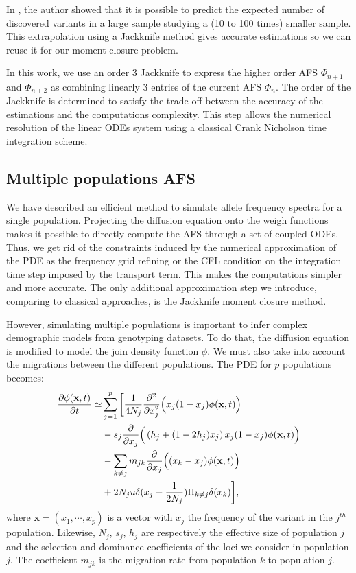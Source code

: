 In \cite{gravel2014}, the author showed that it is possible to predict the expected number of discovered variants in a large sample studying a (10 to 100 times) smaller sample. This extrapolation using a Jackknife method gives accurate estimations so we can reuse it for our moment closure problem.

In this work, we use an order 3 Jackknife to express the higher order AFS $\Phi_{n+1}$ and $\Phi_{n+2}$ as combining linearly 3 entries of the current AFS $\Phi_n$. The order of the Jackknife is determined to satisfy the trade off between the accuracy of the estimations and the computations complexity. This step allows the numerical resolution of the linear ODEs system using a classical Crank Nicholson time integration scheme.  

\subsection{Multiple populations AFS}
We have described an efficient method to simulate allele frequency spectra for a single population. Projecting the diffusion equation onto the weigh functions makes it possible to directly compute the AFS through a set of coupled ODEs. Thus, we get rid of the constraints induced by the numerical approximation of the PDE as the frequency grid refining or the CFL condition on the integration time step imposed by the transport term. This makes the computations simpler and more accurate. The only additional approximation step we introduce, comparing to classical approaches, is the Jackknife moment closure method.

However, simulating multiple populations is important to infer complex demographic models from genotyping datasets. To do that, the diffusion equation is modified to model the join density function $\phi$. We must also take into account the migrations between the different populations. The PDE for $p$ populations becomes: 
 \begin{equation}
\begin{split}
\frac{\partial \phi(\textbf{x},t)}{\partial t}\simeq & \sum_{j=1}^p \bigg[ \frac{1}{4 N_j} \frac{\partial^2 }{\partial x_j^2} \Big( x_j(1-x_j) \phi(\textbf{x},t)\Big) \\
					&-s_j \frac{\partial }{\partial x_j}\Big( \left(h_j+(1-2h_j)x_j \right)x_j (1-x_j) \phi(\textbf{x},t)\Big) \\
					&-\sum_{k \neq j}m_{jk}\frac{\partial }{\partial x_j}\Big( (x_k-x_j) \phi(\textbf{x},t)\Big)\\
					&+ 2 N_j u \delta(x_j-\frac{1}{2 N_j})\Pi_{k\neq j}\delta(x_k)\bigg],
\end{split}
\label{eq:diffnp}
\end{equation}
where $\textbf{x} = (x_1, \cdots, x_p)$ is a vector with $x_j$ the frequency of the variant in the $j^{th}$ population. Likewise, $N_j$, $s_j$, $h_j$ are respectively the effective size of population $j$ and the selection and dominance coefficients of the loci we consider in population $j$. The coefficient $m_{jk}$ is the migration rate from population $k$ to population $j$.

